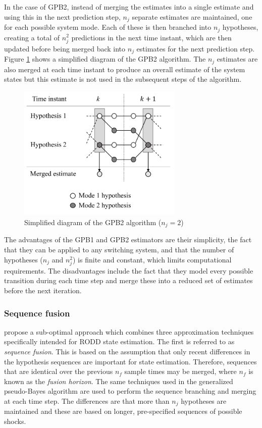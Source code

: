 In the case of GPB2, instead of merging the estimates into a single estimate and using this in the next prediction step, $n_j$ separate estimates are maintained, one for each possible system mode. Each of these is then branched into $n_j$ hypotheses, creating a total of $n_j^2$ predictions in the next time instant, which are then updated before being merged back into $n_j$ estimates for the next prediction step. Figure \ref{fig:mm-obs-gpb2} shows a simplified diagram of the GPB2 algorithm. The $n_j$ estimates are also merged at each time instant to produce an overall estimate of the system states but this estimate is not used in the subsequent steps of the algorithm.
\begin{figure}[htp]
	\centering
	\includegraphics[height=6.5cm]{images/mm_obs_seq_gpb2.pdf}
	\caption{Simplified diagram of the GPB2 algorithm ($n_j=2$)}
	\label{fig:mm-obs-gpb2}
\end{figure}

The advantages of the GPB1 and GPB2 estimators are their simplicity, the fact that they can be applied to any switching system, and that the number of hypotheses ($n_j$ and $n_j^2$) is finite and constant, which limits computational requirements. The disadvantages include the fact that they model every possible transition during each time step and merge these into a reduced set of estimates before the next iteration.


\subsubsection{Sequence fusion} \label{subsec-fusion}

\cite{robertson_detection_1995} propose a sub-optimal approach which combines three approximation techniques specifically intended for RODD state estimation. The first is referred to as \textit{sequence fusion}. This is based on the assumption that only recent differences in the hypothesis sequences are important for state estimation. Therefore, sequences that are identical over the previous $n_f$ sample times may be merged, where $n_f$ is known as the \textit{fusion horizon}. The same techniques used in the generalized pseudo-Bayes algorithm are used to perform the sequence branching and merging at each time step. The differences are that more than $n_j$ hypotheses are maintained and these are based on longer, pre-specified sequences of possible shocks.

